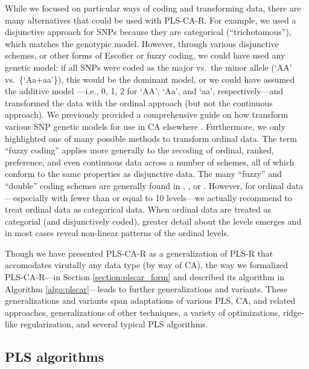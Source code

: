 \documentclass[12pt]{article}
\begin{document}
While we focused on particular ways of coding and transforming data,
there are many alternatives that could be used with PLS-CA-R. For
example, we used a disjunctive approach for SNPs because they are
categorical (``trichotomous''), which matches the genotypic model.
However, through various disjunctive schemes, or other forms of Escofier
or fuzzy coding, we could have used any genetic model: if all SNPs were
coded as the major vs.~the minor allele (`AA' vs.~\{`Aa+aa'\}), this
would be the dominant model, or we could have assumed the additive model
---i.e., 0, 1, 2 for `AA', `Aa', and `aa', respectively---and
transformed the data with the ordinal approach (but not the continuous
approach). We previously provided a comprehensive guide on how transform
various SNP genetic models for use in CA elsewhere \citep[see Appendix
of][]{beaton_partial_2016}. Furthermore, we only highlighted one of many
possible methods to transform ordinal data. The term ``fuzzy coding''
applies more generally to the recoding of ordinal, ranked, preference,
and even continuous data across a number of schemes, all of which
conform to the same properties as disjunctive data. The many ``fuzzy''
and ``double'' coding schemes are generally found in
\citet{escofier_traitement_1979}, \citet{lebart_multivariate_1984}, or
\citet{greenacrefuzzy}. However, for ordinal data---especially with
fewer than or equal to 10 levels---we actually recommend to treat
ordinal data as categorical data. When ordinal data are treated as
categorial (and disjunctively coded), greater detail about the levels
emerges and in most cases reveal non-linear patterns of the ordinal
levels.

Though we have presented PLS-CA-R as a generalization of PLS-R that
accomodates virutally any data type (by way of CA), the way we
formalized PLS-CA-R---in Section \ref{section:plscar_form} and described
its algorithm in Algorithm \ref{algo:plscar}---leads to further
generalizations and variants. These generalizations and variants span
adaptations of various PLS, CA, and related approaches, generalizations
of other techniques, a variety of optimizations, ridge-like
regularization, and several typical PLS algorithms.

\hypertarget{pls-algorithms}{%
\subsection{PLS algorithms}\label{pls-algorithms}}
\end{document}
